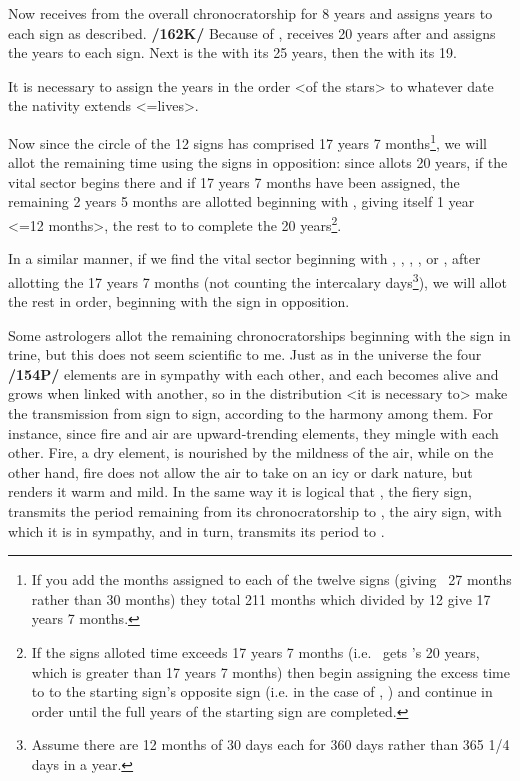 Now \Venus\xspace receives from \Mars\xspace the overall chronocratorship for 8 years and assigns years to
each sign as described. \textbf{/162K/} Because of \Gemini, \Mercury\xspace receives 20 years after \Venus\xspace and assigns the years to each sign. Next is the \Moon\xspace with its 25 years, then the \Sun\xspace with its 19. 

It is necessary to assign the years in the order <of the stars> to whatever date the nativity extends <=lives>.

Now since the circle of the 12 signs has comprised 17 years 7 months\footnote{If you add the months assigned to each of the twelve signs (giving \Capricorn\, 27 months rather than 30 months) they total 211 months which divided by 12 give 17 years 7 months.}, we will allot the remaining time using the signs in opposition: since \Gemini\xspace allots 20 years, if the vital sector begins there and if 17 years 7 months have been assigned, the remaining 2 years 5 months are allotted beginning with \Sagittarius, giving \Sagittarius\xspace itself 1 year <=12 months>, the rest to \Capricorn\xspace to complete the 20 years\footnote{If the signs alloted time exceeds 17 years 7 months (i.e. \Gemini\, gets \Mercury's 20 years, which is greater than 17 years 7 months) then begin assigning the excess time to to the starting sign's opposite sign (i.e. in the case of \Gemini, \Sagittarius) and continue in order until the full years of the starting sign are completed.}.

In a similar manner, if we find the vital sector beginning with \Cancer, \Leo, \Virgo, \Capricorn, or \Aquarius, after allotting the 17 years 7 months (not counting the intercalary days\footnote{Assume there are 12 months of 30 days each for 360 days rather than 365 1/4 days in a year.}), we will allot the rest in order, beginning with the sign in opposition.

Some astrologers allot the remaining chronocratorships beginning with the sign in trine, but this does not seem scientific to me. Just as in the universe the four \textbf{/154P/} elements are in sympathy with each other, and each becomes alive and grows when linked with another, so in the distribution <it is necessary to> make the transmission from sign to sign, according to the harmony among them. For instance, since fire and air are upward-trending elements, they mingle with each other. Fire, a dry element, is nourished
by the mildness of the air, while on the other hand, fire does not allow the air to take on an icy or dark nature, but renders it warm and mild. In the same way it is logical that \Leo, the fiery sign, transmits the period remaining from its chronocratorship to \Aquarius, the airy sign, with which it is in sympathy, and in turn, \Aquarius\xspace transmits its period to \Leo.

